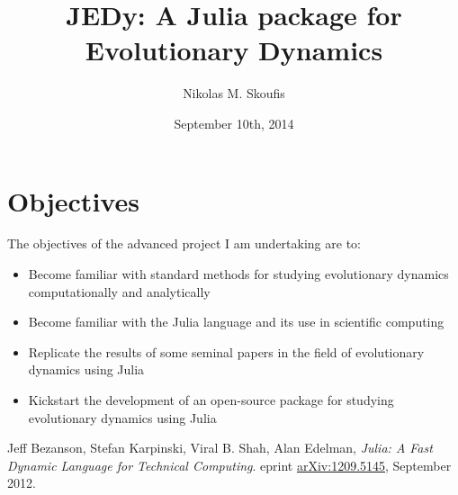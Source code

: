\documentclass[a4paper,12pt]{article}
\begin{document}
\title{JEDy: A Julia package for Evolutionary Dynamics}
\author{Nikolas M. Skoufis}
\date{September 10th, 2014}

\maketitle

\section*{Objectives}

The objectives of the advanced project I am undertaking are to:

\begin{itemize}
        
    \item Become familiar with standard methods for studying evolutionary dynamics computationally and analytically
    \item Become familiar with the Julia \cite{julia} language and its use in scientific computing
    \item Replicate the results of some seminal papers in the field of evolutionary dynamics using Julia
    \item Kickstart the development of an open-source package for studying evolutionary dynamics using Julia

\end{itemize}

\begin{thebibliography}{9}

        Jeff Bezanson, Stefan Karpinski, Viral B. Shah, Alan Edelman,
        \emph{Julia: A Fast Dynamic Language for Technical Computing}.
        eprint \href{http://arxiv.org/pdf/1209.5145v1.pdf}{arXiv:1209.5145},
        September 2012.

\end{thebibliography}
\end{document}
